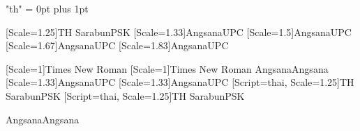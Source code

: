 \usepackage{fontspec,xltxtra,xunicode}

\usepackage{polyglossia}
\XeTeXlinebreaklocale "th"
\XeTeXlinebreakskip = 0pt plus 1pt



\newfontfamily{\thSrB}[Scale=1.25]{TH SarabunPSK}
\newfontfamily{\thAng}[Scale=1.33]{AngsanaUPC}           %
\newfontfamily{\thlarge}[Scale=1.5]{AngsanaUPC}      %
\newfontfamily{\thLarge}[Scale=1.67]{AngsanaUPC}    %
\newfontfamily{\thLARGE}[Scale=1.83]{AngsanaUPC}   %

\newfontfamily{\enTimes}[Scale=1]{Times New Roman}
\newcommand{\textEng}[1]{\enTimes #1 \normalfont}
\newfontfamily{\engmainfont}[Scale=1]{Times New Roman}
\def\Angsa{Angsana}
\def\Sara{Sarabun}
\def\thesisfont{Angsana}
\ifx\thesisfont\Angsa
\newfontfamily{\thaifont}[Scale=1.33]{AngsanaUPC}
\newfontfamily{\thaimainfont}[Scale=1.33]{AngsanaUPC}
\setmainfont[Scale=1.33]{AngsanaUPC}
\else
\newfontfamily{\thaifont}[Script=thai, Scale=1.25]{TH SarabunPSK}
\newfontfamily{\thaimainfont}[Script=thai, Scale=1.25]{TH SarabunPSK}
\setmainfont[Scale=1.25]{TH SarabunPSK}
\fi
\setdefaultlanguage{thai}


\ifx\thesisfont\Angsa
\renewcommand{\textthai}[1]{\thAng #1 \normalfont}
\else
\renewcommand{\textthai}[1]{\thSrB #1 \normalfont}
\fi
\renewcommand{\LARGE}{\thLARGE}
\renewcommand{\Large}{\thLarge}
\renewcommand{\large}{\thlarge}

